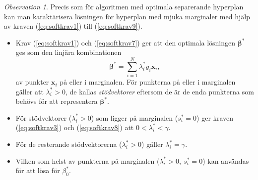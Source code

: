 \documentclass[a4paper, 12pt]{report}
\theoremstyle{definition}
\theoremstyle{remark}
\newtheorem*{rem}{Observation}
\newcommand{\bfbeta}{{\boldsymbol{\beta}}}
\begin{document}
\begin{rem}
	Precis som för algoritmen med optimala separerande hyperplan kan man karaktärisera lösningen för hyperplan med mjuka marginaler med hjälp av kraven (\ref{eq:softkrav1}) till (\ref{eq:softkrav9}).
	\begin{itemize}
		\item Krav (\ref{eq:softkrav1}) och (\ref{eq:softkrav7}) ger att den optimala lösningen $\bfbeta^*$ ges som den linjära kombinationen
		\begin{equation*}
			\bfbeta^* = \sum_{i=1}^{N}\lambda_i^*y_i\mathbf{x}_i,
		\end{equation*}
		av punkter $\mathbf{x}_i$ på eller i marginalen. För punkterna på eller i marginalen gäller att $\lambda^*_i>0$, de kallas \emph{stödvektorer} eftersom de är de enda punkterna som behövs för att representera $\bfbeta^*$.
		\item För stödvektorer ($\lambda^*_i>0$) som ligger på marginalen ($s_i^*=0$) ger kraven (\ref{eq:softkrav3}) och (\ref{eq:softkrav8}) att $0<\lambda_i^*<\gamma$.
		\item För de resterande stödvektorerna ($\lambda_i^*>0$) gäller $\lambda_i^*=\gamma$.
		\item Vilken som helst av punkterna på marginalen ($\lambda^*_i>0,~s^*_i=0$) kan användas för att lösa för $\beta_0^*$.
	\end{itemize}
\end{rem}
\end{document}
